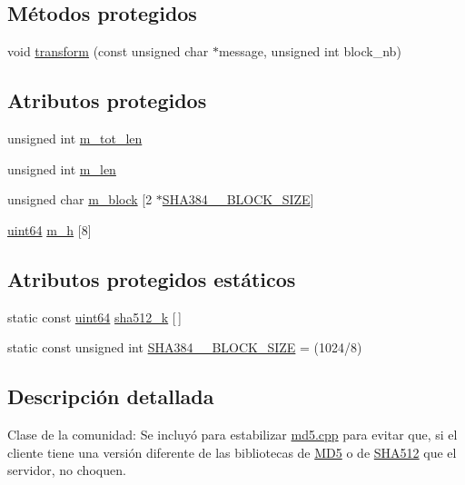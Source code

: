 \subsection*{Métodos protegidos}
\begin{DoxyCompactItemize}
\item 
void \hyperlink{classSHA512_aaa6717d3ffe1b8efa2d17b838276ab29}{transform} (const unsigned char $\ast$message, unsigned int block\+\_\+nb)
\end{DoxyCompactItemize}
\subsection*{Atributos protegidos}
\begin{DoxyCompactItemize}
\item 
unsigned int \hyperlink{classSHA512_a99134ffe06076eaf88e6db543304d0ef}{m\+\_\+tot\+\_\+len}
\item 
unsigned int \hyperlink{classSHA512_ac08a6cd41b96a9ca98ca567c3225bdca}{m\+\_\+len}
\item 
unsigned char \hyperlink{classSHA512_aef099f8df4da2e3ea0a56bf5f0479fce}{m\+\_\+block} \mbox{[}2 $\ast$\hyperlink{classSHA512_a5191f35aa313f5fd0447d2c272a82c99}{S\+H\+A384\+\_\+\_\+\+B\+L\+O\+C\+K\+\_\+\+S\+I\+ZE}\mbox{]}
\item 
\hyperlink{classSHA512_af8e6d233ae15030174e481d6d79b1786}{uint64} \hyperlink{classSHA512_a6fcfcd454382329628cd6baa0487bee5}{m\+\_\+h} \mbox{[}8\mbox{]}
\end{DoxyCompactItemize}
\subsection*{Atributos protegidos estáticos}
\begin{DoxyCompactItemize}
\item 
static const \hyperlink{classSHA512_af8e6d233ae15030174e481d6d79b1786}{uint64} \hyperlink{classSHA512_af6d393ef5aa7458c3545efa1b9d92900}{sha512\+\_\+k} \mbox{[}$\,$\mbox{]}
\item 
static const unsigned int \hyperlink{classSHA512_a5191f35aa313f5fd0447d2c272a82c99}{S\+H\+A384\+\_\+\_\+\+B\+L\+O\+C\+K\+\_\+\+S\+I\+ZE} = (1024/8)
\end{DoxyCompactItemize}


\subsection{Descripción detallada}
Clase de la comunidad\+: Se incluyó para estabilizar \hyperlink{md5_8cpp}{md5.\+cpp} para evitar que, si el cliente tiene una versión diferente de las bibliotecas de \hyperlink{classMD5}{M\+D5} o de \hyperlink{classSHA512}{S\+H\+A512} que el servidor, no choquen. 

